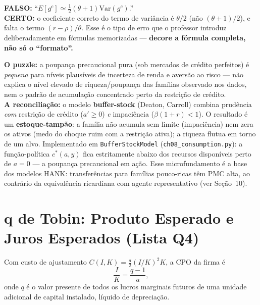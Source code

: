 \documentclass[12pt, a4paper]{article}
\begin{document}
\begin{armbox}[title={Armadilha (P2-2021 Q1-iv): coeficiente errado}]
\textbf{FALSO:} ``$E[g^c]\simeq\tfrac{1}{2}(\theta+1)\mathrm{Var}(g^c)$.'' \\
\textbf{CERTO:} o coeficiente correto do termo de variância é $\theta/2$
(não $(\theta+1)/2$), e falta o termo $(r-\rho)/\theta$. Esse é o tipo de
erro que o professor introduz deliberadamente em fórmulas memorizadas ---
\textbf{decore a fórmula completa, não só o ``formato''.}
\end{armbox}

\begin{provabox}[title={O puzzle e a reconciliação (pergunta dissertativa em aberto)}]
\textbf{O puzzle:} a poupança precaucional pura (sob mercados de crédito
perfeitos) é \emph{pequena} para níveis plausíveis de incerteza de renda e
aversão ao risco --- não explica o nível elevado de riqueza/poupança das
famílias observado nos dados, nem o padrão de acumulação concentrado perto da
restrição de crédito. \\
\textbf{A reconciliação:} o modelo \textbf{buffer-stock} (Deaton, Carroll)
combina prudência \emph{com} restrição de crédito ($a'\ge 0$) \emph{e}
impaciência ($\beta(1+r)<1$). O resultado é um \textbf{estoque-tampão}: a
família não acumula sem limite (impaciência) nem zera os ativos (medo do
choque ruim com a restrição ativa); a riqueza flutua em torno de um alvo.
Implementado em \texttt{BufferStockModel} (\texttt{ch08\_consumption.py}):
a função-política $c^*(a,y)$ fica estritamente abaixo dos recursos
disponíveis perto de $a=0$ --- a poupança precaucional em ação. Esse
microfundamento é a base dos modelos HANK: transferências para famílias
pouco-ricas têm PMC alta, ao contrário da equivalência ricardiana com agente
representativo (ver Seção~10).
\end{provabox}

\section{q de Tobin: Produto Esperado e Juros Esperados (Lista Q4)}

\begin{formulabox}[title={A condição de primeira ordem}]
Com custo de ajustamento $C(I,K)=\tfrac{a}{2}(I/K)^2K$, a CPO da firma é
\[
  \boxed{\frac{I}{K} = \frac{q-1}{a}},
\]
onde $q$ é o valor presente de todos os lucros marginais futuros de uma
unidade adicional de capital instalado, líquido de depreciação.
\end{formulabox}
\end{document}
